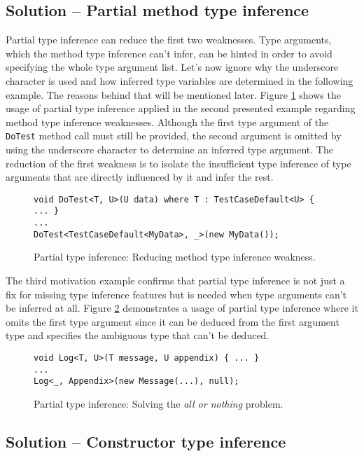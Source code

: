 \subsection{Solution -- Partial method type inference}

Partial type inference can reduce the first two weaknesses. 
Type arguments, which the method type inference can’t infer, can be hinted in order to avoid specifying the whole type argument list. 
Let’s now ignore why the underscore character is used and how inferred type variables are determined in the following example. 
The reasons behind that will be mentioned later.
Figure \ref{img32:sol1} shows the usage of partial type inference applied in the second presented example regarding method type inference weaknesses. 
Although the first type argument of the \texttt{DoTest} method call must still be provided, the second argument is omitted by using the underscore character to determine an inferred type argument. 
The reduction of the first weakness is to isolate the insufficient type inference of type arguments that are directly influenced by it and infer the rest.
\begin{figure}[h]
\begin{lstlisting}[style=csharp]
void DoTest<T, U>(U data) where T : TestCaseDefault<U> { ... }
...
DoTest<TestCaseDefault<MyData>, _>(new MyData());
\end{lstlisting}
\caption{Partial type inference: Reducing method type inference weakness.}
\label{img32:sol1}
\end{figure}
\par
The third motivation example confirms that partial type inference is not just a fix for missing type inference features but is needed when type arguments can’t be inferred at all. 
Figure \ref{img33:sol2} demonstrates a usage of partial type inference where it omits the first type argument since it can be deduced from the first argument type and specifies the ambiguous type that can’t be deduced.
\begin{figure}[h]
\begin{lstlisting}[style=csharp]
void Log<T, U>(T message, U appendix) { ... }
...
Log<_, Appendix>(new Message(...), null);
\end{lstlisting}
\caption{Partial type inference: Solving the \textit{all or nothing} problem.}
\label{img33:sol2}
\end{figure}

\newpage

\subsection{Solution -- Constructor type inference}

